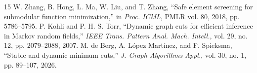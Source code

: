 \documentclass[conference]{IEEEtran}
\begin{document}
\begin{thebibliography}{15}
 W. Zhang, B. Hong, L. Ma, W. Liu, and T. Zhang, ``Safe element screening for submodular function minimization,'' in \emph{Proc. ICML}, PMLR vol. 80, 2018, pp. 5786--5795.
 P. Kohli and P. H. S. Torr, ``Dynamic graph cuts for efficient inference in Markov random fields,'' \emph{IEEE Trans. Pattern Anal. Mach. Intell.}, vol. 29, no. 12, pp. 2079--2088, 2007.
 M. de Berg, A. L\'opez Mart\'inez, and F. Spieksma, ``Stable and dynamic minimum cuts,'' \emph{J. Graph Algorithms Appl.}, vol. 30, no. 1, pp. 89--107, 2026.
\end{thebibliography}
\end{document}
